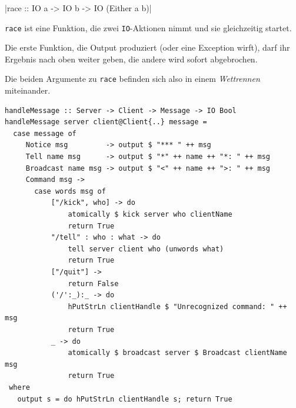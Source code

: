 \documentclass{beamer}
\begin{document}

\begin{frame}[fragile]

|race :: IO a -> IO b -> IO (Either a b)|
\bigskip

\texttt{race} ist eine Funktion, die zwei \texttt{IO}-Aktionen nimmt und sie gleichzeitig 
startet.\pause\smallskip\smallskip

Die erste Funktion, die Output produziert (oder eine Exception wirft), darf ihr Ergebnis nach oben weiter geben, die andere wird sofort abgebrochen.

Die beiden Argumente zu \texttt{race} befinden sich also in einem \emph{Wettrennen} miteinander.
\end{frame}


\begin{frame}[fragile]

\begin{verbatim}
handleMessage :: Server -> Client -> Message -> IO Bool
handleMessage server client@Client{..} message =
  case message of
     Notice msg         -> output $ "*** " ++ msg
     Tell name msg      -> output $ "*" ++ name ++ "*: " ++ msg
     Broadcast name msg -> output $ "<" ++ name ++ ">: " ++ msg
     Command msg ->
       case words msg of
           ["/kick", who] -> do
               atomically $ kick server who clientName
               return True
           "/tell" : who : what -> do
               tell server client who (unwords what)
               return True
           ["/quit"] ->
               return False
           ('/':_):_ -> do
               hPutStrLn clientHandle $ "Unrecognized command: " ++ msg
               return True
           _ -> do
               atomically $ broadcast server $ Broadcast clientName msg
               return True
 where
   output s = do hPutStrLn clientHandle s; return True
\end{verbatim}

\end{frame}
\end{document}
